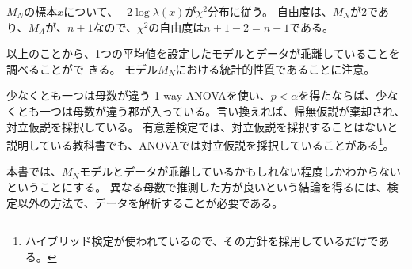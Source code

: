 $M_N$の標本$x$について、$-2\log \lambda(x)$が$\chi^2$分布に従う。
自由度は、$M_N$が$2$であり、$M_A$が、$n+1$なので、$\chi^2$の自由度は$n+1-2=n-1$である。

以上のことから、1つの平均値を設定したモデルとデータが乖離していることを調べることがで
きる。
モデル$M_N$における統計的性質であることに注意。

\begin{SMbox}{少なくとも一つは母数が違う}
    1-way ANOVAを使い、$p<\alpha$を得たならば、少なくとも一つは母数が違う郡が入っている。言い換えれば、帰無仮説が棄却され、対立仮説を採択している。    
    有意差検定では、対立仮説を採択することはないと説明している教科書でも、ANOVAでは対立仮説を採択していることがある\footnote{ハイブリッド検定が使われているので、その方針を採用しているだけである。}。
    
    本書では、$M_N$モデルとデータが乖離しているかもしれない程度しかわからないということにする。
    異なる母数で推測した方が良いという結論を得るには、検定以外の方法で、データを解析することが必要である。
\end{SMbox}

